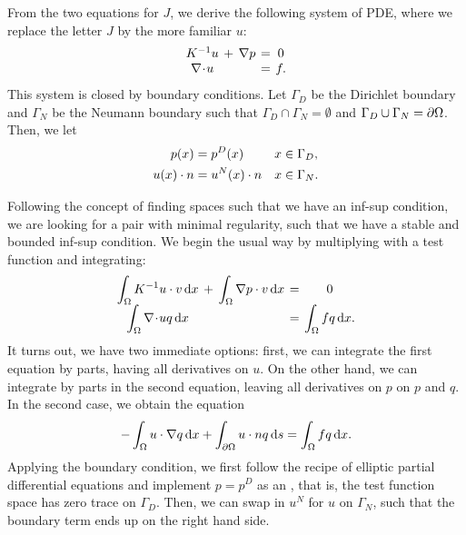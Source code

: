 \begin{intro}
  From the two equations for $J$, we derive the following system of
  PDE, where we replace the letter $J$ by the more familiar $u$:
  \begin{gather}
    \label{eq:darcy:5}
    \arraycolsep2pt
    \begin{matrix}
      K^{-1} u &+& \nabla p &=& 0 \\
      \div u &&&=& f.
    \end{matrix}
  \end{gather}
  This system is closed by boundary conditions. Let $\Gamma_D$ be the
  Dirichlet boundary and $\Gamma_N$ be the Neumann boundary such that
  $\Gamma_D \cap \Gamma_N = \emptyset$ and
  $\Gamma_D\cup\Gamma_N = \partial\Omega$. Then, we let
  \begin{gather}
    \label{eq:darcy:6}
    \begin{aligned}
      p(x) &= p^D(x) & x & \in \Gamma_D, \\
      u(x)\cdot n &= u^N(x)\cdot n & x & \in \Gamma_N.
    \end{aligned}
  \end{gather}

  Following the concept of finding spaces such that we have an inf-sup
  condition, we are looking for a pair with minimal regularity, such
  that we have a stable and bounded inf-sup condition. We begin the
  usual way by multiplying with a test function and integrating:
  \begin{gather}
    \label{eq:darcy:7}
    \arraycolsep2pt
    \begin{matrix}
      \displaystyle\int_\domain K^{-1} u\cdot v\dx
      &+&
      \displaystyle\int_\domain \nabla p \cdot v\dx
      &=& 0 \\
      \displaystyle\int_\domain \div u q\dx
      &&&=&
      \displaystyle\int_\domain fq\dx.
    \end{matrix}
  \end{gather}
  It turns out, we have two immediate options: first, we can integrate
  the first equation by parts, having all derivatives on $u$. On the
  other hand, we can integrate by parts in the second equation,
  leaving all derivatives on $p$ on $p$ and $q$. In the second case,
  we obtain the equation
  \begin{gather*}
    -\int_\Omega u\cdot\nabla q\,\mathrm{d} x + \int_{\partial\Omega} u\cdot n q \,\mathrm{d} s
    = \int_\Omega fq\,\mathrm{d} x.
  \end{gather*}
  Applying the boundary condition, we first follow the recipe of
  elliptic partial differential equations and implement $p=p^D$ as an
  , that is, the test function
  space has zero trace on $\Gamma_D$. Then, we can swap in $u^N$ for
  $u$ on $\Gamma_N$, such that the boundary term ends up on the right
  hand side.
\end{intro}

